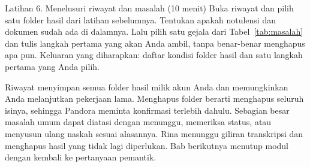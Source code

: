 \begin{kegiatan}{Latihan 6. Menelusuri riwayat dan masalah (10 menit)}
Buka riwayat dan pilih satu folder hasil dari latihan sebelumnya. Tentukan apakah notulensi dan dokumen sudah ada di dalamnya. Lalu pilih satu gejala dari Tabel~\ref{tab:masalah} dan tulis langkah pertama yang akan Anda ambil, tanpa benar-benar menghapus apa pun. Keluaran yang diharapkan: daftar kondisi folder hasil dan satu langkah pertama yang Anda pilih.
\end{kegiatan}

\begin{rangkuman}
Riwayat menyimpan semua folder hasil milik akun Anda dan memungkinkan Anda melanjutkan pekerjaan lama. Menghapus folder berarti menghapus seluruh isinya, sehingga Pandora meminta konfirmasi terlebih dahulu. Sebagian besar masalah umum dapat diatasi dengan menunggu, memeriksa status, atau menyusun ulang naskah sesuai alasannya. Rina menunggu giliran transkripsi dan menghapus hasil yang tidak lagi diperlukan. Bab berikutnya menutup modul dengan kembali ke pertanyaan pemantik.
\end{rangkuman}
